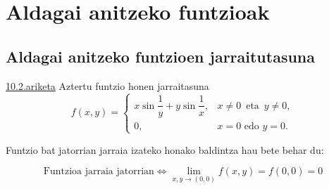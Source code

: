 \chapter{Aldagai anitzeko funtzioak}
\section{Aldagai anitzeko funtzioen jarraitutasuna}
\underline{10.2.ariketa} Aztertu funtzio honen jarraitasuna
$$f(x,y) = \left\{ \begin{array}{cl}
		x\sin \dfrac{1}{y} +y \sin \dfrac{1}{x},  &  x \neq 0 \, \mbox{ eta } \, y \neq 0, \\
                 0,	                                &  x=0 \mbox{ edo } y=0.
		   \end{array} \right. $$
		   
		 
Funtzio bat jatorrian jarraia izateko honako baldintza hau bete behar du:

\begin{equation*}
    \text{Funtzioa jarraia jatorrian}
    \Longleftrightarrow
    \boxed{\lim_{x,y \to (0,0)}f(x,y)=f(0,0)=0}
\end{equation*}
	   
